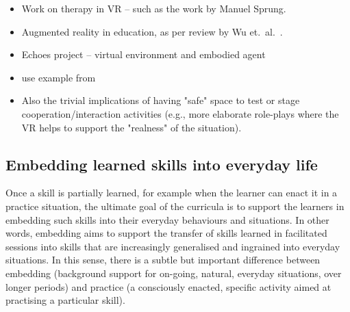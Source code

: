\documentclass[prodmode,acmtochi]{acmsmall}
\begin{document}
\begin{itemize}
                        \item Work on therapy in VR -- such as the work by Manuel Sprung. 

                        \item Augmented reality in education, as per review by Wu et.~al.~\cite{Wu2012}.
                        \item Echoes project \cite{Porayska-Pomsta2011} -- virtual environment and embodied agent
                        \item use example from \cite{Core2006}
                        \item Also the trivial implications of having "safe" space to test or stage cooperation/interaction activities (e.g., more elaborate role-plays where the VR helps to support the "realness" of the situation). 
\end{itemize}
\fi





\subsection{Embedding learned skills into everyday life} 
        Once a skill is partially learned, for example when the learner can enact it in a practice situation, the ultimate goal of the curricula is to support the learners in embedding such skills into their everyday behaviours and situations. In other words, embedding aims to support the transfer of skills learned in facilitated sessions into skills that are increasingly generalised and ingrained into everyday situations. In this sense, there is a subtle but important difference between embedding (background support for on-going, natural, everyday situations, over longer periods) and practice (a consciously enacted, specific activity aimed at practising a particular skill).
\end{document}

